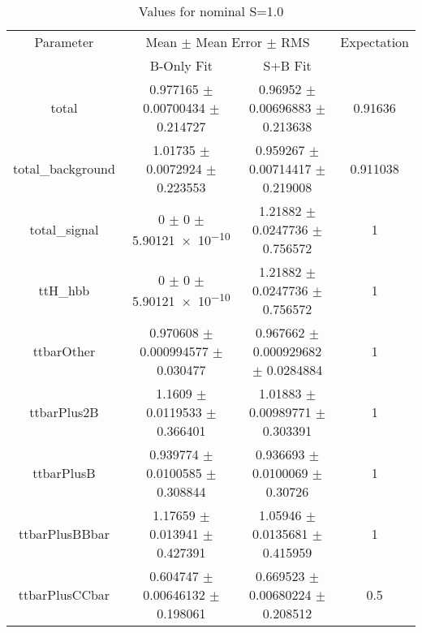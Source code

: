 \begin{table}
\centering
\caption{Values for nominal S=1.0}
\begin{tabular}{cccc}
\toprule
Parameter & \multicolumn{2}{c}{Mean $\pm$ Mean Error $\pm$ RMS} & Expectation\\
 & B-Only Fit & S+B Fit & \\
\midrule
total & \num{0.977165} $\pm$ \num{0.00700434} $\pm$ \num{0.214727} & \num{0.96952} $\pm$ \num{0.00696883} $\pm$ \num{0.213638} & \num{0.91636}\\
total\_background & \num{1.01735} $\pm$ \num{0.0072924} $\pm$ \num{0.223553} & \num{0.959267} $\pm$ \num{0.00714417} $\pm$ \num{0.219008} & \num{0.911038}\\
total\_signal & \num{0} $\pm$ \num{0} $\pm$ \num{5.90121e-10} & \num{1.21882} $\pm$ \num{0.0247736} $\pm$ \num{0.756572} & \num{1}\\
ttH\_hbb & \num{0} $\pm$ \num{0} $\pm$ \num{5.90121e-10} & \num{1.21882} $\pm$ \num{0.0247736} $\pm$ \num{0.756572} & \num{1}\\
ttbarOther & \num{0.970608} $\pm$ \num{0.000994577} $\pm$ \num{0.030477} & \num{0.967662} $\pm$ \num{0.000929682} $\pm$ \num{0.0284884} & \num{1}\\
ttbarPlus2B & \num{1.1609} $\pm$ \num{0.0119533} $\pm$ \num{0.366401} & \num{1.01883} $\pm$ \num{0.00989771} $\pm$ \num{0.303391} & \num{1}\\
ttbarPlusB & \num{0.939774} $\pm$ \num{0.0100585} $\pm$ \num{0.308844} & \num{0.936693} $\pm$ \num{0.0100069} $\pm$ \num{0.30726} & \num{1}\\
ttbarPlusBBbar & \num{1.17659} $\pm$ \num{0.013941} $\pm$ \num{0.427391} & \num{1.05946} $\pm$ \num{0.0135681} $\pm$ \num{0.415959} & \num{1}\\
ttbarPlusCCbar & \num{0.604747} $\pm$ \num{0.00646132} $\pm$ \num{0.198061} & \num{0.669523} $\pm$ \num{0.00680224} $\pm$ \num{0.208512} & \num{0.5}\\
\bottomrule
\end{tabular}
\end{table}